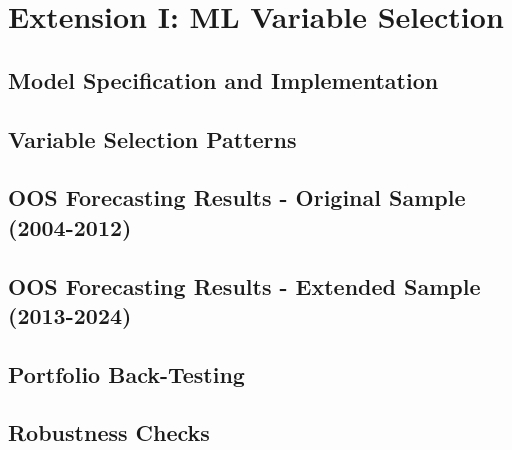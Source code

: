 
\section{Extension I: ML Variable Selection}
\subsection{Model Specification and Implementation}
\subsection{Variable Selection Patterns}
\subsection{OOS Forecasting Results - Original Sample (2004-2012)}
\subsection{OOS Forecasting Results - Extended Sample (2013-2024)}
\subsection{Portfolio Back-Testing}
\subsection{Robustness Checks}